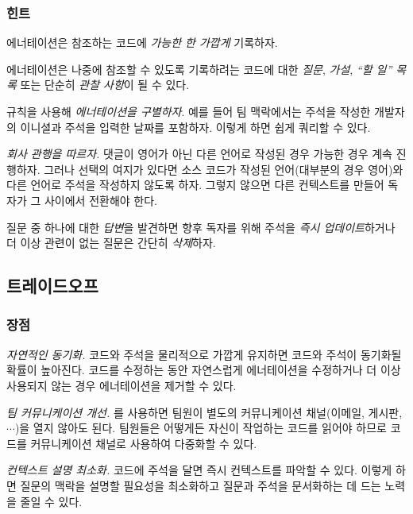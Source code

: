 \documentclass[a4paper,10pt,twoside]{book}
\begin{document}
\subsubsection*{힌트}

\begin{bulletlist}
\item 에너테이션은 참조하는 코드에 \emph{가능한 한 가깝게} 기록하자.

\item 에너테이션은 나중에 참조할 수 있도록 기록하려는 코드에 대한 \emph{질문}, \emph{가설}, \emph{``할 일'' 목록} 또는 단순히 \emph{관찰 사항}이 될 수 있다.

\item 규칙을 사용해 \emph{에너테이션을 구별하자}. 예를 들어 팀 맥락에서는 주석을 작성한 개발자의 이니셜과 주석을 입력한 날짜를 포함하자. 이렇게 하면 쉽게 쿼리할 수 있다.

\item \emph{회사 관행을 따르자.} 댓글이 영어가 아닌 다른 언어로 작성된 경우 가능한 경우 계속 진행하자. 그러나 선택의 여지가 있다면 소스 코드가 작성된 언어(대부분의 경우 영어)와 다른 언어로 주석을 작성하지 않도록 하자. 그렇지 않으면 다른 컨텍스트를 만들어 독자가 그 사이에서 전환해야 한다. 

\item 질문 중 하나에 대한 \emph{답변}을 발견하면 향후 독자를 위해 주석을 \emph{즉시 업데이트}하거나 더 이상 관련이 없는 질문은 간단히 \emph{삭제}하자.
\end{bulletlist}

\subsection*{트레이드오프}

\subsubsection*{장점}

\begin{bulletlist}
\item \emph{자연적인 동기화.} 코드와 주석을 물리적으로 가깝게 유지하면 코드와 주석이 동기화될 확률이 높아진다. 코드를 수정하는 동안 자연스럽게 에너테이션을 수정하거나 더 이상 사용되지 않는 경우 에너테이션을 제거할 수 있다.

\item \emph{팀 커뮤니케이션 개선.} 를 사용하면 팀원이 별도의 커뮤니케이션 채널(이메일, 게시판, $\cdots$)을 열지 않아도 된다. 팀원들은 어떻게든 자신이 작업하는 코드를 읽어야 하므로 코드를 커뮤니케이션 채널로 사용하여 다중화할 수 있다.

\item \emph{컨텍스트 설명 최소화.} 코드에 주석을 달면 즉시 컨텍스트를 파악할 수 있다. 이렇게 하면 질문의 맥락을 설명할 필요성을 최소화하고 질문과 주석을 문서화하는 데 드는 노력을 줄일 수 있다.
\end{bulletlist}
\end{document}
